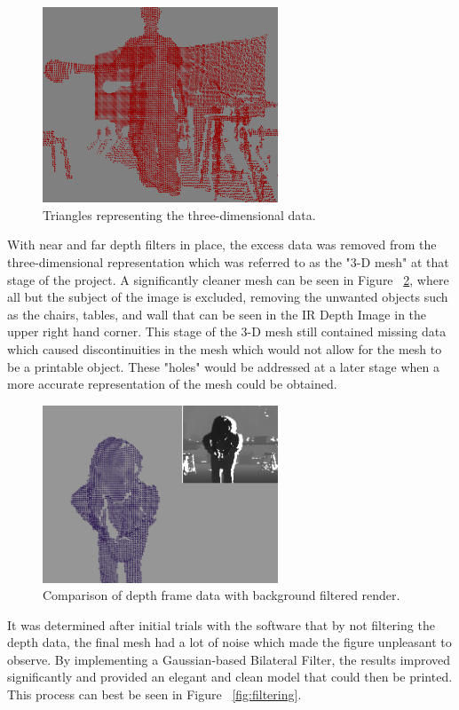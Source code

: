 \documentclass[pdftex,10.5pt]{report}
\begin{document}
\begin{figure}[H]
	\centering
	\includegraphics[width=70mm]{figures/3dtriangles.png}
	\caption{Triangles representing the three-dimensional data.}
	\label{3dtri}
\end{figure}

With near and far depth filters in place, the excess data was removed from the three-dimensional representation which was referred to as the "3-D mesh" at that stage of the project. A significantly cleaner mesh can be seen in Figure ~\ref{balls2}, where all but the subject of the image is excluded, removing the unwanted objects such as the chairs, tables, and wall that can be seen in the IR Depth Image in the upper right hand corner. This stage of the 3-D mesh still contained missing data which caused discontinuities in the mesh which would not allow for the mesh to be a printable object. These "holes" would be addressed at a later stage when a more accurate representation of the mesh could be obtained.
\begin{figure}[H]
	\centering
	\includegraphics[width=70mm]{figures/cadyholdingball2.png}
	\caption{Comparison of depth frame data with background filtered render.}
	\label{balls2}
\end{figure}

It was determined after initial trials with the software that by not filtering the depth data, the final mesh had a lot of noise which made the figure unpleasant to observe. By implementing a Gaussian-based Bilateral Filter, the results improved significantly and provided an elegant and clean model that could then be printed. This process can best be seen in Figure ~\ref{fig:filtering}.
\end{document}
